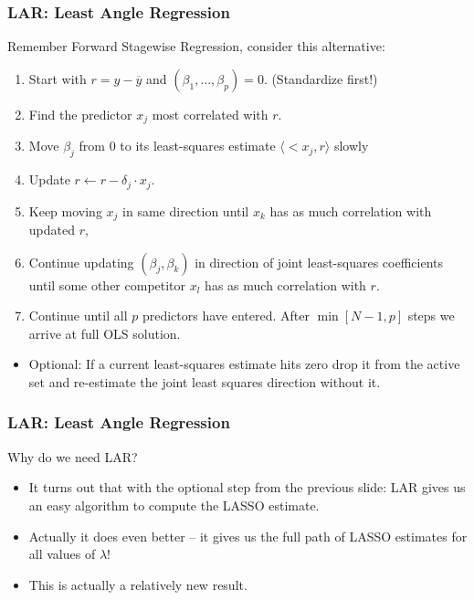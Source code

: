 \documentclass[xcolor=pdftex,dvipsnames,table,mathserif,aspectratio=169]{beamer}
\begin{document}
\begin{frame}
\frametitle{LAR: Least Angle Regression}
Remember Forward Stagewise Regression, consider this alternative:
\begin{enumerate}
\item Start with $r= y-\overline{y}$ and $(\beta_1, \ldots, \beta_p) = 0$. (Standardize first!)
\item Find the predictor $x_j$ most correlated with $r$.
\item Move $\beta_j$ from 0 to its least-squares estimate $\langle<x_j , r \rangle$ slowly
\item Update $r \leftarrow r - \delta_j \cdot x_j$.
\item Keep moving $x_j$ in same direction until $x_k$ has as much correlation with updated $r$,
\item Continue updating $(\beta_j, \beta_k)$ in direction of \alert{joint} least-squares coefficients until some other competitor $x_l$ has as much correlation with $r$.
\item Continue until all $p$ predictors have entered. After $\min[N-1,p]$ steps we arrive at full OLS solution.
\end{enumerate}
\begin{itemize}
\item \alert{Optional:} If a current least-squares estimate hits zero drop it from the active set and re-estimate the joint least squares direction without it.
\end{itemize}
\end{frame}


\begin{frame}
\frametitle{LAR: Least Angle Regression}
Why do we need LAR?
\begin{itemize}
\item It turns out that with the optional step from the previous slide: LAR gives us an easy algorithm to compute the LASSO estimate.
\item Actually it does even better -- it gives us the full path of LASSO estimates for all values of $\lambda$!
\item This is actually a relatively new result.
\end{itemize}
\end{frame}
\end{document}
